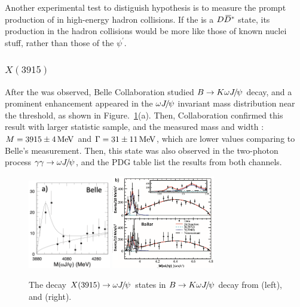 Another experimental test to distiguish hypothesis is to measure the prompt production of \theX in high-energy hadron collisions.
If the \theX is a ${D}{{\kern 0.18em\overline{\kern -0.18em D}}{}^*}$ state,
its production in the hadron collisions would be more like those of known nuclei stuff, 
rather than those of the $\psi^{'}$\supercite{PhysRevLett.103.162001}.


\subsubsection{$X(3915)$}

After the \theX was observed,
Belle Collaboration studied $B\rightarrow K\omega{\ensuremath{{J\mskip -3mu/\mskip -2mu\psi}}}$ decay,
and a prominent enhancement appeared in the $\omega{\ensuremath{{J\mskip -3mu/\mskip -2mu\psi}}}$ invariant mass distribution near the threshold,
as shown in Figure.~\ref{fig:X3915}(a).
Then,
\babar Collaboration confirmed this result with larger statistic sample,
and the measured mass and width : $M=3915\pm4\text{\,Me\kern -0.1em V}$ and $\Gamma=31\pm11\text{\,Me\kern -0.1em V}$,
which are lower values comparing to Belle's measurement\supercite{PhysRevD.82.011101}.
Then,
this state was also observed in the two-photon process $\gamma\gamma\rightarrow\omega{\ensuremath{{J\mskip -3mu/\mskip -2mu\psi}}}$, 
and the PDG table list the results from both channels\supercite{PDG2020}.

\begin{figure}[!hbtp]
\centering
   \includegraphics[width=0.32\textwidth]{Figures/01_Introduction/Exotic/X3915_BELLE}%
   \includegraphics[width=0.4\textwidth]{Figures/01_Introduction/Exotic/X3915_BABAR}%
   \caption{ The decay $X(3915)\rightarrow\omega{\ensuremath{{J\mskip -3mu/\mskip -2mu\psi}}}$ states in $B\rightarrow K\omega{\ensuremath{{J\mskip -3mu/\mskip -2mu\psi}}}$ decay from \belle\supercite{PhysRevLett.103.162001} (left),
   and \babar\supercite{PhysRevD.82.011101} (right).}
\label{fig:X3915}
\end{figure}

